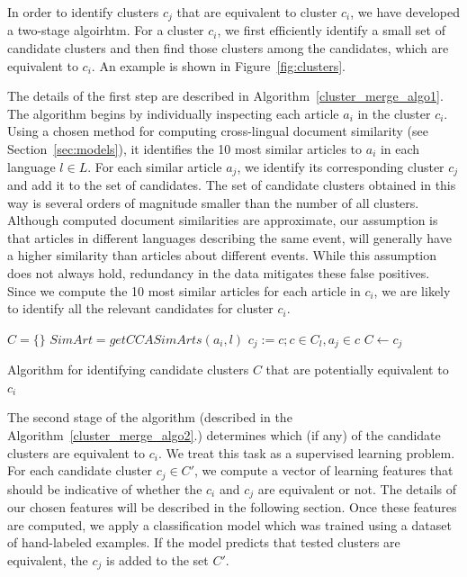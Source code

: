\documentclass[twoside,11pt]{article}
\begin{document}
In order to identify clusters $c_j$ that are equivalent to cluster $c_i$, we have developed a two-stage algoirhtm. For a cluster $c_i$, we first efficiently identify a small set of candidate clusters and then find those clusters among the candidates, which are equivalent to $c_i$. An example is  shown in  Figure~\ref{fig:clusters}.

The details of the first step are described in Algorithm~\ref{cluster_merge_algo1}. The algorithm begins by individually inspecting each article $a_i$ in the cluster $c_i$. Using a chosen method for computing cross-lingual document similarity (see Section~\ref{sec:models}), it identifies the 10 most similar articles to $a_i$ in each language $l \in L$. For each  similar article $a_j$, we identify its corresponding  cluster $c_j$ and add it to the set of candidates. The set of candidate clusters obtained in this way is several orders of magnitude smaller than the number of all clusters. Although computed document similarities are approximate, our  assumption  is that articles in different languages describing the same event, will generally have a higher similarity than articles about different events. While this assumption does not always hold, redundancy in the data mitigates these false positives. Since we compute the 10 most similar articles for each article in $c_i$, we are likely to identify all the relevant candidates for cluster $c_i$.

\begin{algorithm}[t!]
$C = \{\}$\;
 {
     {
        $SimArt = getCCASimArts(a_i, l)$\;
         {
            $c_j := c ; c \in C_l, a_j \in c$\;
            $C \leftarrow c_j$\;
        }
    }
}
\caption{Algorithm for identifying candidate clusters $C$ that are potentially equivalent to $c_i$}
\label{cluster_merge_algo1}
\end{algorithm}

The second stage of the algorithm (described in the Algorithm~\ref{cluster_merge_algo2}.) determines which (if any) of the candidate clusters are equivalent to $c_i$. We treat this task as a supervised learning problem. For each candidate cluster $c_j \in C'$, we compute a vector of learning features that should be indicative of whether the $c_i$ and $c_j$ are equivalent or not. The details of our chosen features will be described in the following section. Once these features are computed, we apply a classification model which was trained using a  dataset  of hand-labeled examples. If the model predicts that tested clusters are equivalent, the $c_j$ is added to the set $C'$.
\end{document}
